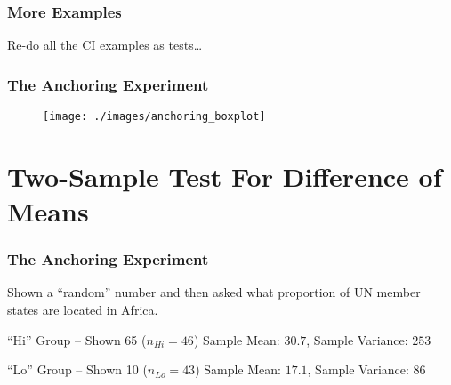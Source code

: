 \begin{frame}
  \frametitle{More Examples}
  Re-do all the CI examples as tests\dots
\end{frame}
\begin{frame}
\frametitle{The Anchoring Experiment}
\begin{figure}
\centering
\texttt{[image: ./images/anchoring\_boxplot]}
\end{figure}
\end{frame}
\section{Two-Sample Test For Difference of Means}
\begin{frame}
\frametitle{The Anchoring Experiment}
Shown a ``random'' number and then asked what proportion of UN member states are located in Africa.
	\begin{block}{``Hi'' Group -- Shown 65 ($n_{Hi}=46$)}
		Sample Mean: $30.7$, Sample Variance: $253$
\end{block}


	\begin{block}{``Lo'' Group -- Shown 10 ($n_{Lo}=43$)}
	Sample Mean: $17.1$, Sample Variance: $86$
\end{block}


\vspace{1em}

\hfill\alert{}
\end{frame}

